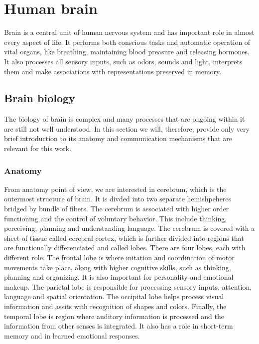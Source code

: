 \chapter{Human brain}
Brain is a central unit of human nervous system and has important role in almost
every aspect of life. It performs both conscious tasks and automatic operation
of vital organs, like breathing, maintaining blood preasure and releasing
hormones. It also processes all sensory inputs, such as odors, sounds and light,
interprets them and make associations with representations preserved in memory.
\section{Brain biology}
The biology of brain is complex and many processes that are ongoing within it
are still not well understood. In this section we will, therefore, provide only
very brief introduction to its anatomy and communication mechanisms that are
relevant for this work.
\subsection{Anatomy}
From anatomy point of view, we are interested in cerebrum, which is the
outermost structure of brain. It is divded into two separate hemishpeheres
bridged by bundle of fibers. The cerebrum is associated with higher order
functioning and the control of voluntary behavior. This include thinking,
perceiving, planning and understanding language. The cerebrum is covered with a
sheet of tissue called cerebral cortex, which is further divided into regions
that are functionally differenciated and called lobes. There are four lobes,
each with different role. The frontal lobe is where initation and coordination
of motor movements take place, along with higher cognitive skills, such as
thinking, planning and organizing. It is also important for personality and
emotional makeup. The parietal lobe is responsible for processing sensory
inputs, attention, language and spatial orientation. The occipital lobe helps
process visual information and assits with recognition of shapes and colors.
Finally, the temporal lobe is region where auditory information is processed and
the information from other senses is integrated. It also has a role in
short-term memory and in learned emotional responses. \cite{brainFacts}

